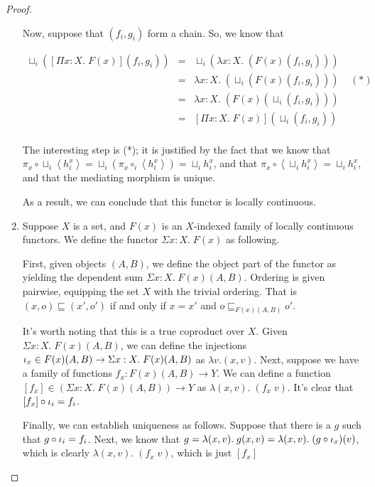 \begin{proof}
\begin{enumerate}
Now, suppose that $(f_i,g_i)$ form a chain. So, we know that 

\begin{displaymath}
\begin{array}{lcl}
\sqcup_i ([\Pi x:X.\; F(x)](f_i,g_i)) & = & 
  \sqcup_i (\lambda x:X.\; (F(x) (f_i, g_i))) \\
& = & 
  \lambda x:X.\; (\sqcup_i (F(x) (f_i, g_i))) \;\;\;\;(*) \\
& = & 
  \lambda x:X.\; (F(x) (\sqcup_i (f_i, g_i))) \\
& = & 
[\Pi x:X.\; F(x)] (\sqcup_i (f_i,g_i)) \\
\end{array}
\end{displaymath}

The interesting step is (*); it is justified by the fact
that we know that $\pi_x \circ \sqcup_i \left<h^x_i\right> =  
\sqcup_i (\pi_x \circ_i \left<h^x_i\right>) = 
\sqcup_i h^x_i$, 
and that $\pi_x \circ \left<\sqcup_i h^x_i\right> 
          = \sqcup_i h^x_i$, 
and that the mediating morphism is unique.

As a result, we can conclude that this functor is locally 
continuous.

\item Suppose $X$ is a set, and $F(x)$ is an $X$-indexed family
of locally continuous functors. We define the functor $\Sigma x:X.\;
F(x)$ as following.

First, given objects $(A,B)$, we define the object part of the functor
as yielding the dependent sum $\Sigma x:X.\; F(x)(A,B)$. Ordering is
given pairwise, equipping the set $X$ with the trivial ordering. 
That is $(x,o) \sqsubseteq (x', o')$ if and only if $x = x'$ and 
$o \sqsubseteq_{F(x)(A,B)} o'$. 

It's worth noting that this is a true coproduct over $X$. Given
$\Sigma x:X.\; F(x)(A,B)$, we can define the injections $\iota_{x} \in
F(x)(A,B) \to \Sigma x:X.\; F(x)(A,B)$ as $\lambda v. (x,v)$. 
Next, suppose we have a family of functions $f_x : F(x)(A,B) \to Y$. 
We can define a function $[f_x] \in (\Sigma x:X.\; F(x)(A,B)) \to Y$ as
$\lambda (x,v).\; (f_x\;v)$. It's clear that $[f_x]\circ \iota_{i} = f_i$. 

Finally, we can establish uniqueness as follows. Suppose that there 
is a $g$ such that $g \circ \iota_{i} = f_i$. Next, we know that 
$g = \lambda (x,v).\;g (x, v) = \lambda (x,v).\;(g\circ\iota_{x})(v)$,
which is clearly $\lambda (x,v).\; (f_x\;v)$, which is just $[f_x]$



\end{enumerate}
\end{proof}
